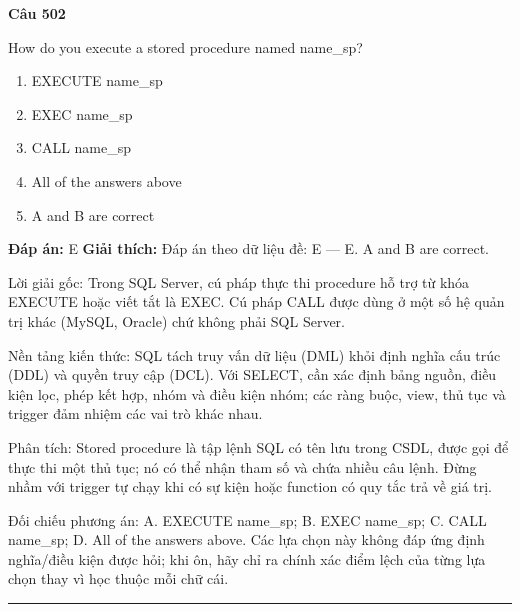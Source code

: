 \documentclass[11pt,a4paper]{article}
\newenvironment{question}[1]{%
  \par\vspace{1em}\noindent\textbf{\large Câu #1}\par\vspace{0.4em}
}{%
  \par\vspace{1em}\hrule\vspace{0.6em}
}
\newenvironment{choices}{%
  \begin{enumerate}[label=\textbf{\Alph*.},leftmargin=2.2em,itemsep=2pt,topsep=3pt]
}{%
  \end{enumerate}
}
\newcommand{\choice}{\item}
\begin{document}
\begin{question}{502}
How do you execute a stored procedure named name_sp?
\begin{choices}
\choice EXECUTE name_sp
\choice EXEC name_sp
\choice CALL name_sp
\choice All of the answers above
\choice A and B are correct
\end{choices}
\textbf{Đáp án:} E
\textbf{Giải thích:} Đáp án theo dữ liệu đề: E — E. A and B are correct.

Lời giải gốc: Trong SQL Server, cú pháp thực thi procedure hỗ trợ từ khóa EXECUTE hoặc viết tắt là EXEC. Cú pháp CALL được dùng ở một số hệ quản trị khác (MySQL, Oracle) chứ không phải SQL Server.

Nền tảng kiến thức: SQL tách truy vấn dữ liệu (DML) khỏi định nghĩa cấu trúc (DDL) và quyền truy cập (DCL). Với SELECT, cần xác định bảng nguồn, điều kiện lọc, phép kết hợp, nhóm và điều kiện nhóm; các ràng buộc, view, thủ tục và trigger đảm nhiệm các vai trò khác nhau.

Phân tích: Stored procedure là tập lệnh SQL có tên lưu trong CSDL, được gọi để thực thi một thủ tục; nó có thể nhận tham số và chứa nhiều câu lệnh. Đừng nhầm với trigger tự chạy khi có sự kiện hoặc function có quy tắc trả về giá trị.

Đối chiếu phương án: A. EXECUTE name_sp; B. EXEC name_sp; C. CALL name_sp; D. All of the answers above. Các lựa chọn này không đáp ứng định nghĩa/điều kiện được hỏi; khi ôn, hãy chỉ ra chính xác điểm lệch của từng lựa chọn thay vì học thuộc mỗi chữ cái.
\end{question}
\end{document}
